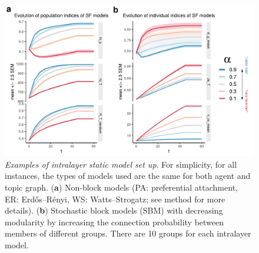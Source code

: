 \begin{figure}[!ht]
    \centering
    \includegraphics[width=\textwidth]{figures/Fig2.pdf}
    \caption{\label{fig:2}
    \textit{Examples of intralayer static model set up}. For simplicity, for all instances, the types of models used are the same for both agent and topic graph.
    (\textbf{a}) Non-block models (PA: preferential attachment, ER: Erdős–Rényi, WS: Watts–Strogatz; see method for more details). (\textbf{b}) Stochastic block models (SBM) with decreasing modularity by increasing the connection probability between members of different groups. There are 10 groups for each intralayer model.
    }
\end{figure}